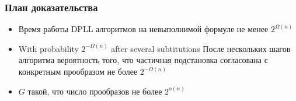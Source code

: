 \begin{frame}
	\frametitle{План доказательства}

	\begin{itemize}
		\pause
		\item Время работы DPLL алгоритмов на невыполнимой формуле не менее $2^{\Omega(n)}$
		\pause
		\item With probability $2^{-\Omega(n)}$ after several subtitutions 
    	После нескольких шагов алгоритма вероятность того, что частичная подстановка согласована
			с конкретным прообразом не более $2^{-\Omega(n)}$
		\pause
		\item $G$ такой, что число прообразов не более $2^{o(n)}$
	\end{itemize}
   
\end{frame}